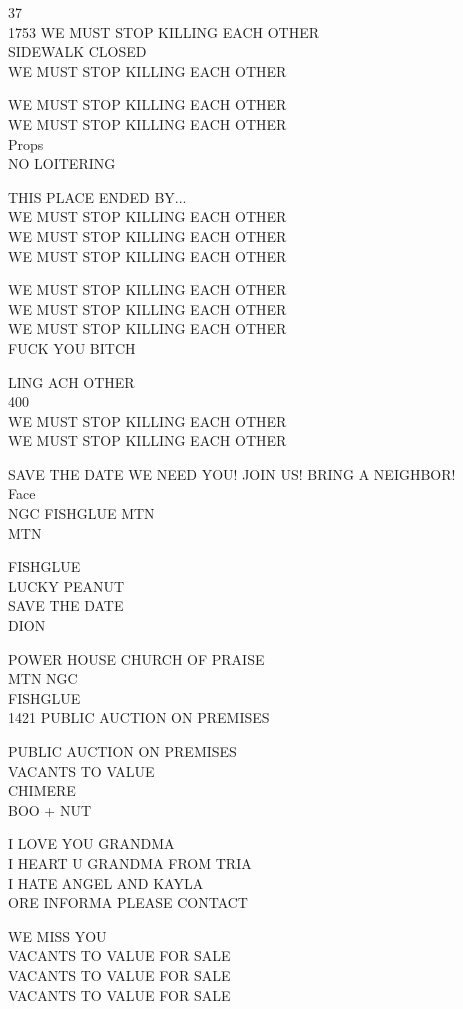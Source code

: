 \documentclass[10pt,letterpaper]{article}
\begin{document}
37\\
1753 WE MUST STOP KILLING EACH OTHER\\
SIDEWALK CLOSED\\
WE MUST STOP KILLING EACH OTHER

WE MUST STOP KILLING EACH OTHER\\
WE MUST STOP KILLING EACH OTHER\\
Props\\
NO LOITERING

THIS PLACE ENDED BY...\\
WE MUST STOP KILLING EACH OTHER\\
WE MUST STOP KILLING EACH OTHER\\
WE MUST STOP KILLING EACH OTHER

WE MUST STOP KILLING EACH OTHER\\
WE MUST STOP KILLING EACH OTHER\\
WE MUST STOP KILLING EACH OTHER\\
FUCK YOU BITCH

LING ACH OTHER\\
400\\
WE MUST STOP KILLING EACH OTHER\\
WE MUST STOP KILLING EACH OTHER

SAVE THE DATE WE NEED YOU!  JOIN US!  BRING A NEIGHBOR!\\
Face\\
NGC FISHGLUE MTN\\
MTN

FISHGLUE\\
LUCKY PEANUT\\
SAVE THE DATE\\
DION

POWER HOUSE CHURCH OF PRAISE\\
MTN NGC\\
FISHGLUE\\
1421 PUBLIC AUCTION ON PREMISES

PUBLIC AUCTION ON PREMISES\\
VACANTS TO VALUE\\
CHIMERE\\
BOO + NUT

I LOVE YOU GRANDMA\\
I HEART U GRANDMA FROM TRIA\\
I HATE ANGEL AND KAYLA\\
ORE INFORMA PLEASE CONTACT

WE MISS YOU\\
VACANTS TO VALUE FOR SALE\\
VACANTS TO VALUE FOR SALE\\
VACANTS TO VALUE FOR SALE
\end{document}
